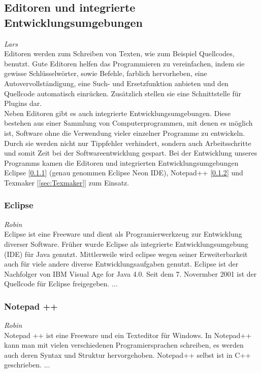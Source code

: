 \documentclass[12pt,a4paper,bibliography=totocnumbered,listof=totocnumbered]{scrartcl}
\begin{document}
\subsection{Editoren und integrierte Entwicklungsumgebungen}
\label{sec:Editoren}
\emph{Lars}\\
Editoren werden zum Schreiben von Texten, wie zum Beispiel Quellcodes, benutzt. Gute Editoren helfen das Programmieren zu vereinfachen, indem sie gewisse Schlüsselwörter, sowie Befehle, farblich hervorheben, eine Autovervollständigung, eine Such- und Ersetzfunktion anbieten und den Quellcode automatisch einrücken. Zusätzlich stellen sie eine Schnittstelle für Plugins dar.\cite{Texteditor}\\
Neben Editoren gibt es auch integrierte Entwicklungsumgebungen. Diese bestehen aus einer Sammlung von Computerprogrammen, mit denen es möglich ist, Software ohne die Verwendung vieler einzelner Programme zu entwickeln. Durch sie werden nicht nur Tippfehler verhindert, sondern auch Arbeitsschritte und somit Zeit bei der Softwareentwicklung gespart.\cite{Integrierte_Entwicklungsumgebung}\cite{Medienbruch}
Bei der Entwicklung unseres Programms kamen die Editoren und integrierten Entwicklungsumgebungen Eclipse [\ref{sec:Eclipse}] (genau genommen Eclipse Neon IDE), Notepad++ [\ref{sec:Notepad++}] und Texmaker [\ref{sec:Texmaker}] zum Einsatz.

\subsubsection{Eclipse}
\label{sec:Eclipse}
\emph{Robin}\\
Eclipse ist eine Freeware und dient als Programierwerkzeug zur Entwicklung diverser Software. Früher wurde Eclipse als integrierte Entwicklungsumgebung (IDE) für Java genutzt. Mittlerweile wird eclipse wegen seiner Erweiterbarkeit auch für viele andere diverse Entwicklungsaufgaben genutzt. Eclipse ist der Nachfolger von IBM Visual Age for Java 4.0. Seit dem 7. Novermber 2001 ist der Quellcode für Eclipse freigegeben. \cite{Eclipse}
...

\subsubsection{Notepad ++}
\label{sec:Notepad++}
\emph{Robin}\\
Notepad ++ ist eine Freeware und ein Texteditor für Windows. In Notepad++ kann man mit vielen verschiedenen Programiersprachen schreiben, es werden auch deren Syntax und Struktur hervorgehoben. Notepad++ selbst ist in C++ geschrieben. \cite{Notepad}
...
\end{document}
